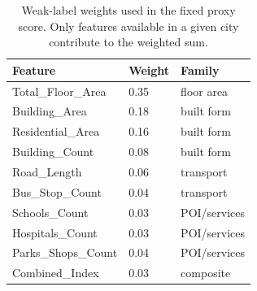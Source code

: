 \begin{table}[H]
\centering
\small
\caption{Weak-label weights used in the fixed proxy score. Only features available in a given city contribute to the weighted sum.}
\label{tab:s6-weak-label-weights}
\begin{tabular}{lll}
\toprule
Feature & Weight & Family \\
\midrule
Total\_Floor\_Area & 0.35 & floor area \\
Building\_Area & 0.18 & built form \\
Residential\_Area & 0.16 & built form \\
Building\_Count & 0.08 & built form \\
Road\_Length & 0.06 & transport \\
Bus\_Stop\_Count & 0.04 & transport \\
Schools\_Count & 0.03 & POI/services \\
Hospitals\_Count & 0.03 & POI/services \\
Parks\_Shops\_Count & 0.04 & POI/services \\
Combined\_Index & 0.03 & composite \\
\bottomrule
\end{tabular}
\end{table}

